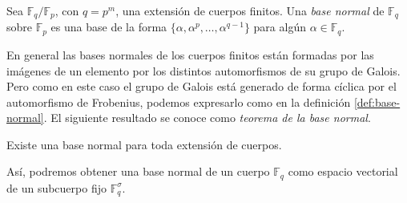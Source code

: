 \begin{definition}
  \label{def:base-normal}
  Sea \(\mathbb F_{q}/\mathbb F_p\), con \(q = p^m\), una extensión de cuerpos finitos. Una \emph{base normal} de \(\mathbb F_{q}\) sobre \(\mathbb F_p\) es una base de la forma \(\{\alpha, \alpha^p, \dots, \alpha^{q - 1}\}\) para algún \(\alpha \in \mathbb F_{q}\).
\end{definition}

En general las bases normales de los cuerpos finitos están formadas por las imágenes de un elemento por los distintos automorfismos de su grupo de Galois.
Pero como en este caso el grupo de Galois está generado de forma cíclica por el automorfismo de Frobenius, podemos expresarlo como en la definición \ref{def:base-normal}.
El siguiente resultado se conoce como \emph{teorema de la base normal}.

\begin{theorem}
  Existe una base normal para toda extensión de cuerpos.
\end{theorem}

Así, podremos obtener una base normal de un cuerpo \(\mathbb F_q\) como espacio vectorial de un subcuerpo fijo \(\mathbb F_q^{\sigma}\).

